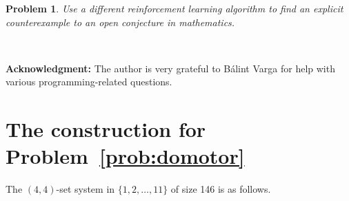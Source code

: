 \documentclass[11pt,english]{article}
\theoremstyle{plain}
\newtheorem{problem}[theorem]{Problem}
\theoremstyle{remark}
\begin{document}
\begin{problem}
Use a different reinforcement learning algorithm to find an explicit counterexample to an open conjecture in mathematics.
\end{problem}

~

\textbf{Acknowledgment:} The author is very grateful to B\'alint Varga for help with various programming-related questions.

\vspace{-0.2in}





\appendix
\section{The construction for Problem~\ref{prob:domotor}}

The $(4,4)$-set system in $\{1, 2,\ldots, 11\}$ of size 146 is as follows.

~
\end{document}
